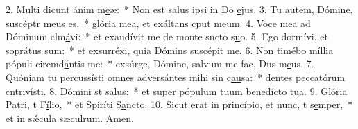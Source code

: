 2. Multi dicunt ánim m\uline{e}æ:~* Non est salus ipsi in Do \uline{e}jus.
3. Tu autem, Dómine, suscéptr m\uline{e}us es,~* glória mea, et exáltans cput m\uline{e}um.
4. Voce mea ad Dóminum clm\uline{á}vi:~* et exaudívit me de monte sncto s\uline{u}o.
5. Ego dormívi, et sopr\uline{á}tus sum:~* et exsurréxi, quia Dómins susc\uline{é}pit me.
6. Non timébo míllia pópuli circmd\uline{á}ntis me:~* exsúrge, Dómine, salvum me fac, Dus m\uline{e}us.
7. Quóniam tu percussísti omnes adversántes mihi sin c\uline{au}sa:~* dentes peccatórum cntriv\uline{í}sti.
8. Dómini st s\uline{a}lus:~* et super pópulum tuum benedícto t\uline{u}a.
9. Glória Patri, t F\uline{í}lio,~* et Spiríti S\uline{a}ncto.
10. Sicut erat in princípio, et nunc, t s\uline{e}mper,~* et in sǽcula sæculrum. \uline{A}men.
